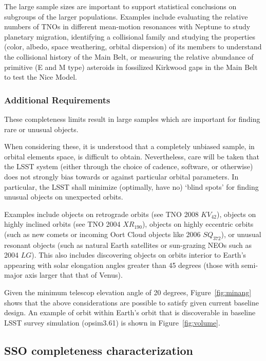 \documentclass[manuscript]{aastex}
\begin{document}
The large sample sizes are important to support statistical conclusions on subgroups of the larger populations. Examples include evaluating the relative numbers of TNOs in different mean-motion resonances with Neptune to study planetary migration, identifying a collisional family and studying the properties (color, albedo, space weathering, orbital dispersion) of its members to understand the collisional history of the Main Belt, or measuring the relative abundance of primitive (E and M type) asteroids in fossilized Kirkwood gaps in the Main Belt to test the Nice Model. 


\subsubsection{Additional Requirements}

These completeness limits result in large samples which are important for finding rare or unusual objects.

When considering these, it is understood that a completely unbiased sample, in orbital elements space, is difficult to obtain. Nevertheless, care will be taken that the LSST system (either through the choice of cadence, software, or otherwise) does not strongly bias towards or against particular orbital parameters. In particular, the LSST shall minimize (optimally, have no) `blind spots' for finding unusual objects on unexpected orbits.

Examples include objects on retrograde orbits (see TNO 2008 $KV_{42}$), objects on highly inclined orbits (see TNO 2004 $XR_{190}$),  objects on highly eccentric orbits (such as new comets or incoming Oort Cloud objects like 2006 $SQ_{372}$), or unusual resonant objects (such as natural Earth satellites or sun-grazing NEOs such as 2004 $LG$).  This also includes discovering objects on orbits interior to Earth's appearing with solar elongation angles greater than 45 degrees (those with semi-major axis larger that that of Venus). 

Given the minimum telescop elevation angle of 20 degrees, Figure~\ref{fig:minang} shows that the above considerations are possible to satisfy given current baseline design. An example of orbit within Earth's orbit that is discoverable in baseline LSST survey simulation (opsim3.61) is shown in Figure~\ref{fig:volume}.

\subsection{SSO completeness characterization}
\end{document}
